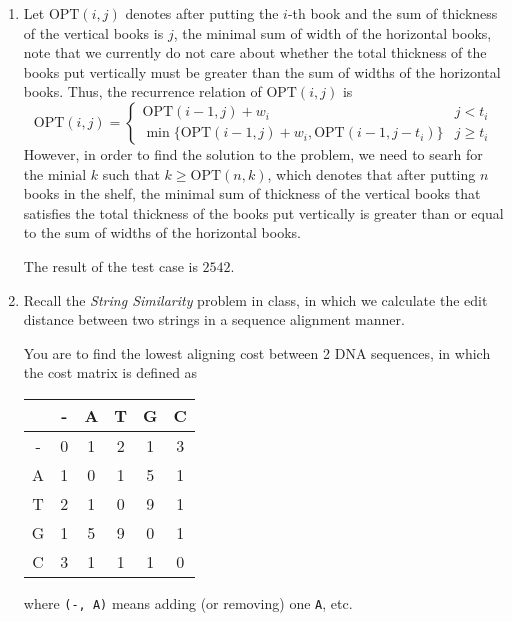 \documentclass[12pt,a4paper]{article}
\makeatletter
\newtheorem*{solution}{Solution}
\theoremstyle{definition}
\renewenvironment{solution}[1][Solution] {\par\pushQED{\qed}\normalfont\topsep6\p@\@plus6\p@\relax\trivlist\item[\hskip\labelsep\bfseries#1\@addpunct{.}]\ignorespaces}{\popQED\endtrivlist\@endpefalse} \makeatother
\makeatother
\begin{document}
\begin{enumerate}
    \begin{solution}
    	Let $\textrm{OPT}(i,j)$ denotes after putting the $i$-th book and the sum of thickness of the vertical books is $j$, the minimal sum of width of the horizontal books, note that we currently do not care about whether the total thickness of the books put vertically must be greater than the sum of widths of the horizontal books. Thus, the recurrence relation of $\textrm{OPT}(i,j)$ is $$\textrm{OPT}(i, j)=\left\{\begin{array}{ll}
   	 	\textrm{OPT}(i-1, j)+ w_i & j < t_i\\
    	\min \{ \textrm{OPT}(i-1, j)+ w_i, \textrm{OPT}(i-1, j-t_i) \} & j \geq t_i
    	\end{array}\right.
    	$$
    	However, in order to find the solution to the problem, we need to searh for the minial $k$ such that $k \geq \textrm{OPT}(n,k)$, which denotes that after putting $n$ books in the shelf, the minimal sum of thickness of the vertical books that satisfies the total thickness of the books put vertically is greater than or equal to the sum of widths of the horizontal books.
    	
    	The result of the test case is $2542$.
    \end{solution}

    \item
    Recall the \emph{String Similarity} problem in class, in which we calculate the edit distance between two strings in a sequence alignment manner.

    You are to find the lowest aligning cost between 2 DNA sequences, in which the cost matrix is defined as

    \begin{center}
        \begin{tabular}{|c||c|c|c|c|c|}
        \hline
          & - & A & T & G & C \\
        \hline
        - & 0 & 1 & 2 & 1 & 3 \\
        A & 1 & 0 & 1 & 5 & 1 \\
        T & 2 & 1 & 0 & 9 & 1 \\
        G & 1 & 5 & 9 & 0 & 1 \\
        C & 3 & 1 & 1 & 1 & 0 \\
        \hline
        \end{tabular}
    \end{center}

    where \texttt{(-, A)} means adding (or removing) one \texttt{A}, etc.


\end{enumerate}
\end{document}
